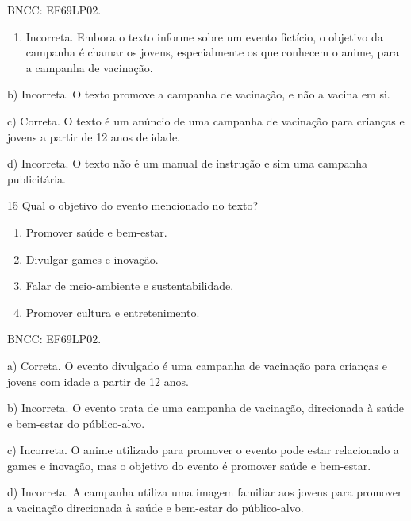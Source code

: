 BNCC: EF69LP02.

\begin{enumerate}
\def\labelenumi{\alph{enumi})}
\tightlist
\item
  Incorreta. Embora o texto informe sobre um evento fictício, o objetivo
  da campanha é chamar os jovens, especialmente os que conhecem o anime,
  para a campanha de vacinação.
\end{enumerate}

b) Incorreta. O texto promove a campanha de vacinação, e não a vacina em
si.

c) Correta. O texto é um anúncio de uma campanha de vacinação para
crianças e jovens a partir de 12 anos de idade.

d) Incorreta. O texto não é um manual de instrução e sim uma campanha
publicitária.

\num{15} Qual o objetivo do evento mencionado no texto?

\begin{enumerate}
\def\labelenumi{\alph{enumi})}
\item
  Promover saúde e bem-estar.
\item
  Divulgar games e inovação.
\item
  Falar de meio-ambiente e sustentabilidade.
\item
  Promover cultura e entretenimento.
\end{enumerate}

BNCC: EF69LP02.

a) Correta. O evento divulgado é uma campanha de vacinação para crianças
e jovens com idade a partir de 12 anos.

b) Incorreta. O evento trata de uma campanha de vacinação, direcionada à
saúde e bem-estar do público-alvo.

c) Incorreta. O anime utilizado para promover o evento pode estar
relacionado a games e inovação, mas o objetivo do evento é promover
saúde e bem-estar.

d) Incorreta. A campanha utiliza uma imagem familiar aos jovens para
promover a vacinação direcionada à saúde e bem-estar do público-alvo.
